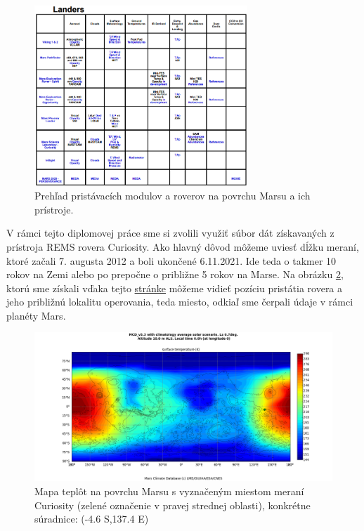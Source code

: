 \begin{figure}[!htbp]
  \centering
  \includegraphics[width=8cm]{img/landers.png}
  \caption{Prehľad pristávacích modulov a roverov na povrchu Marsu a ich prístroje.}
  \label{landers}
\end{figure}

V rámci tejto diplomovej práce sme si zvolili využiť súbor dát získavaných z prístroja REMS rovera Curiosity. Ako hlavný dôvod môžeme uviesť dĺžku meraní, ktoré začali 7. augusta 2012 a boli ukončené 6.11.2021. Ide teda o takmer 10 rokov na Zemi alebo po prepočne o približne 5 rokov na Marse. Na obrázku \ref{curiosity_landing_site}, ktorú sme získali vďaka tejto \href{http://www-mars.lmd.jussieu.fr/mars/access.html}{stránke} môžeme vidieť pozíciu pristátia rovera a jeho približnú lokalitu operovania, teda miesto, odkiaľ sme čerpali údaje v rámci planéty Mars. 
\begin{figure}[!htbp]
  \centering
  \includegraphics[width=14cm]{img/surface_temp.png}
  \caption{Mapa teplôt na povrchu Marsu s vyznačeným miestom meraní Curiosity (zelené označenie v pravej strednej oblasti), konkrétne súradnice: (-4.6 S,137.4 E)}
  \label{curiosity_landing_site}
\end{figure}
\newpage

